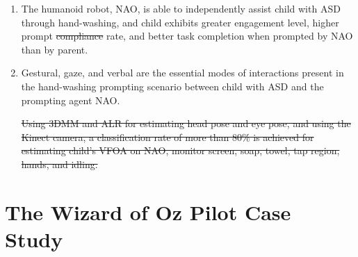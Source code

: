 \documentclass{ut-thesis}
\providecommand{\DIFaddtex}[1]{{\protect\color{blue}\uwave{#1}}} %
\providecommand{\DIFdeltex}[1]{{\protect\color{red}\sout{#1}}}                      %
\providecommand{\DIFaddbegin}{} %
\providecommand{\DIFaddend}{} %
\providecommand{\DIFdelbegin}{} %
\providecommand{\DIFdelend}{} %
\providecommand{\DIFadd}[1]{\texorpdfstring{\DIFaddtex{#1}}{#1}} %
\providecommand{\DIFdel}[1]{\texorpdfstring{\DIFdeltex{#1}}{}} %
\begin{document}
\begin{enumerate}
	\item The humanoid robot, NAO, is able to independently assist child with ASD through hand-washing, and child exhibits greater engagement level, higher prompt \DIFdelbegin \DIFdel{compliance }\DIFdelend \DIFaddbegin \DIFadd{complying }\DIFaddend rate, and better task completion when prompted by NAO than by parent.

	\item Gestural, gaze, and verbal are the essential modes of interactions present in the hand-washing prompting scenario between child with ASD and the prompting agent NAO.

\DIFdelbegin %
\DIFdel{Using 3DMM and ALR for estimating head pose and eye pose, and using the Kinect camera, a classification rate of more than 80\% is achieved for estimating child's VFOA on NAO, monitor screen, soap, towel, tap region, hands, and idling.
	}\DIFdelend %

\end{enumerate}

\chapter{The Wizard of Oz Pilot Case Study}



\end{document}
